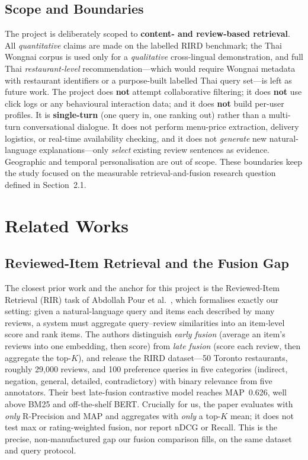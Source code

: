 \documentclass[10pt,twocolumn]{article}
\begin{document}
\subsection{Scope and Boundaries}
\label{sec:scope}
The project is deliberately scoped to \textbf{content- and review-based retrieval}. All
\emph{quantitative} claims are made on the labelled RIRD benchmark; the Thai Wongnai
corpus is used only for a \emph{qualitative} cross-lingual demonstration, and full Thai
\emph{restaurant-level} recommendation---which would require Wongnai metadata with
restaurant identifiers or a purpose-built labelled Thai query set---is left as future
work. The project does \textbf{not} attempt collaborative filtering; it does \textbf{not}
use click logs or any behavioural interaction data; and it does \textbf{not} build
per-user profiles. It is \textbf{single-turn} (one query in, one ranking out) rather
than a multi-turn conversational dialogue. It does not perform menu-price extraction,
delivery logistics, or real-time availability checking, and it does not \emph{generate}
new natural-language explanations---only \emph{select} existing review sentences as
evidence. Geographic and temporal personalisation are out of scope. These boundaries
keep the study focused on the measurable retrieval-and-fusion research question defined
in Section~2.1.

\section{Related Works}

\subsection{Reviewed-Item Retrieval and the Fusion Gap}
The closest prior work and the anchor for this project is the Reviewed-Item Retrieval
(RIR) task of Abdollah Pour et al.~\cite{rird2023}, which formalises exactly our
setting: given a natural-language query and items each described by many reviews, a
system must aggregate query--review similarities into an item-level score and rank
items. The authors distinguish \emph{early fusion} (average an item's reviews into one
embedding, then score) from \emph{late fusion} (score each review, then aggregate the
top-$K$), and release the RIRD dataset---50 Toronto restaurants, roughly 29{,}000
reviews, and 100 preference queries in five categories (indirect, negation, general,
detailed, contradictory) with binary relevance from five annotators. Their best
late-fusion contrastive model reaches MAP~0.626, well above BM25 and off-the-shelf
BERT. Crucially for us, the paper evaluates with \emph{only} R-Precision and MAP and
aggregates with \emph{only} a top-$K$ mean; it does not test max or rating-weighted
fusion, nor report nDCG or Recall. This is the precise, non-manufactured gap our fusion
comparison fills, on the same dataset and query protocol.
\end{document}
